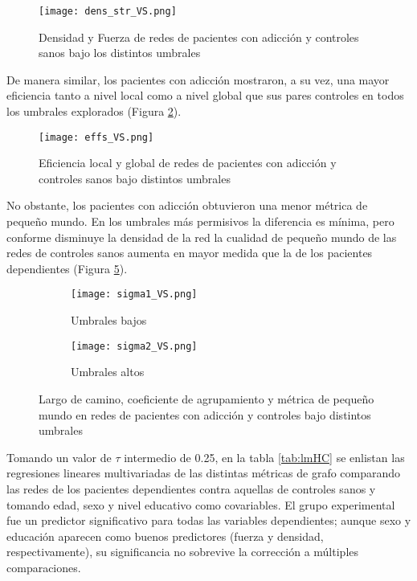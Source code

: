 \begin{figure}[!ht]
    \centering
    \texttt{[image: dens\_str\_VS.png]}
    \caption{Densidad y Fuerza de redes de pacientes con adicción y controles sanos bajo los distintos umbrales}
    \label{fig:dsHC}
\end{figure}

De manera similar, los pacientes con adicción mostraron, a su vez, una mayor eficiencia tanto a nivel local como a nivel global que sus pares controles en todos los umbrales explorados (Figura \ref{fig:effHC}).

\begin{figure}[!ht]
    \centering
    \texttt{[image: effs\_VS.png]}
    \caption{Eficiencia local y global de redes de pacientes con adicción y controles sanos bajo distintos umbrales}
    \label{fig:effHC}
\end{figure}

No obstante, los pacientes con adicción obtuvieron una menor métrica de pequeño mundo.
En los umbrales más permisivos la diferencia es mínima, pero conforme disminuye la densidad de la red la cualidad de pequeño mundo de las redes de controles sanos aumenta en mayor medida que la de los pacientes dependientes (Figura \ref{fig:sigmaHC}).

\begin{figure}[!ht]
    \centering
    \begin{subfigure}[t]{0.8\textwidth}
        \centering
        \texttt{[image: sigma1\_VS.png]}
        \caption{Umbrales bajos}
        \label{fig:sigma1}
    \end{subfigure}
    \begin{subfigure}[t]{0.8\textwidth}
        \centering
        \texttt{[image: sigma2\_VS.png]}
        \caption{Umbrales altos}
        \label{fig:sigma2}
    \end{subfigure}
    \caption{Largo de camino, coeficiente de agrupamiento y métrica de pequeño mundo en redes de pacientes con adicción y controles bajo distintos umbrales}
    \label{fig:sigmaHC}
\end{figure}

Tomando un valor de $\tau$ intermedio de 0.25, en la tabla \ref{tab:lmHC} se enlistan las regresiones lineares multivariadas de las distintas métricas de grafo comparando las redes de los pacientes dependientes contra aquellas de controles sanos y tomando edad, sexo y nivel educativo como covariables. El grupo experimental fue un predictor significativo para todas las variables dependientes; aunque sexo y educación aparecen como buenos predictores (fuerza y densidad, respectivamente), su significancia no sobrevive la corrección a múltiples comparaciones.

